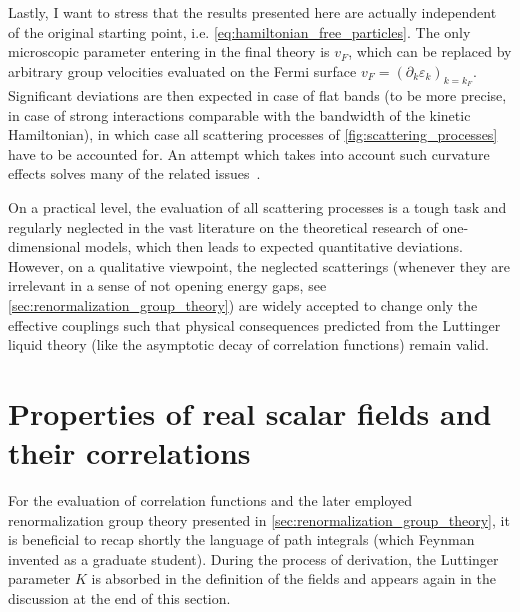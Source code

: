 Lastly, I want to stress that the results presented here are actually independent of the original starting point, i.e. \cref{eq:hamiltonian_free_particles}.
The only microscopic parameter entering in the final theory is $v_F$, which can be replaced by arbitrary group velocities evaluated on the Fermi surface $v_F=(\partial_k\varepsilon_k)_{k=k_F}$.
Significant deviations are then expected in case of flat bands (to be more precise, in case of strong interactions comparable with the bandwidth of the kinetic Hamiltonian), in which case all scattering processes of \cref{fig:scattering_processes} have to be accounted for.
An attempt which takes into account such curvature effects solves many of the related issues~\cite{Imambekov2009}.

On a practical level, the evaluation of all scattering processes is a tough task and regularly neglected in the vast literature on the theoretical research of one-dimensional models, which then leads to expected quantitative deviations.
However, on a qualitative viewpoint, the neglected scatterings (whenever they are irrelevant in a sense of not opening energy gaps, see \cref{sec:renormalization_group_theory}) are widely accepted to change only the effective couplings such that physical consequences predicted from the Luttinger liquid theory (like the asymptotic decay of correlation functions) remain valid.
%
%
\section{Properties of real scalar fields and their correlations}
\label{sec:properties_of_real_scalar_fields_and_their_correlations}
For the evaluation of correlation functions and the later employed renormalization group theory presented in \cref{sec:renormalization_group_theory}, it is beneficial to recap shortly the language of path integrals (which Feynman invented as a graduate student).
During the process of derivation, the Luttinger parameter $K$ is absorbed in the definition of the fields and appears again in the discussion at the end of this section.


